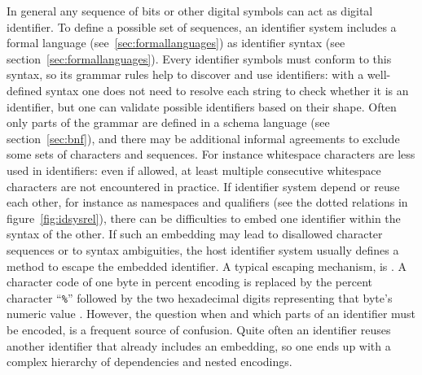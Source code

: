 In general any sequence of bits or other digital symbols can act as 
digital identifier. To define a possible set of sequences, an identifier system 
includes a formal language (see~\ref{sec:formallanguages})
as identifier syntax (see section~\ref{sec:formallanguages}). Every identifier 
symbols must conform to this syntax, so its grammar rules help to discover and 
use identifiers: with a well-defined syntax one does not need to resolve each 
string to check whether it is an identifier, but one can validate possible 
identifiers based on their shape. Often only parts of the grammar are defined in 
a schema language (see section~\ref{sec:bnf}), and there may be additional 
informal agreements to exclude some sets of characters and sequences. For 
instance whitespace characters are less used in identifiers: even if allowed,
at least multiple consecutive whitespace characters are not encountered in 
practice. If identifier system depend or reuse each other, for instance 
as namespaces and qualifiers (see the dotted relations in 
figure~\ref{fig:idsysrel}), there can be difficulties to embed one identifier
within the syntax of the other. If such an embedding may lead to 
disallowed character sequences or to syntax ambiguities, the host identifier 
system usually defines a method to escape the embedded identifier. A typical 
escaping mechanism, is . A character code of one byte 
in percent encoding is replaced by the percent character ``\verb|%|'' followed
by the two hexadecimal digits representing that byte's numeric value
\cite[section~2.1]{BernersLee2005}. However, the question when and which parts
of an identifier must be encoded, is a frequent source of confusion. Quite
often an identifier reuses another identifier that already includes an 
embedding, so one ends up with a complex hierarchy of dependencies and 
nested encodings.

